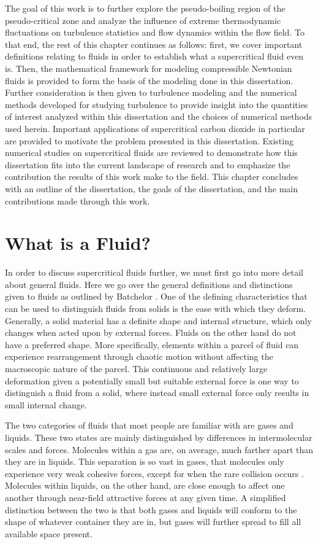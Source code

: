 The goal of this work is to further explore the pseudo-boiling region of the pseudo-critical zone and analyze the influence of extreme thermodynamic fluctuations on turbulence statistics and flow dynamics within the flow field. To that end, the rest of this chapter continues as follows: first, we cover important definitions relating to fluids in order to establish what a supercritical fluid even is. Then, the mathematical framework for modeling compressible Newtonian fluids is provided to form the basis of the modeling done in this dissertation. Further consideration is then given to turbulence modeling and the numerical methods developed for studying turbulence to provide insight into the quantities of interest analyzed within this dissertation and the choices of numerical methods used herein. Important applications of supercritical carbon dioxide in particular are provided to motivate the problem presented in this dissertation. Existing numerical studies on supercritical fluids are reviewed to demonstrate how this dissertation fits into the current landscape of research and to emphasize the contribution the results of this work make to the field. This chapter concludes with an outline of the dissertation, the goals of the dissertation, and the main contributions made through this work. 

\section{What is a Fluid?} 

In order to discuss supercritical fluids further, we must first go into more detail about general fluids. Here we go over the general definitions and distinctions given to fluids as outlined by Batchelor \cite{batchelor_2000}. One of the defining characteristics that can be used to distinguish fluids from solids is the ease with which they deform. Generally, a solid material has a definite shape and internal structure, which only changes when acted upon by external forces. Fluids on the other hand do not have a preferred shape. More specifically, elements within a parcel of fluid can experience rearrangement through chaotic motion without affecting the macroscopic nature of the parcel. This continuous and relatively large deformation given a potentially small but suitable external force is one way to distinguish a fluid from a solid, where instead small external force only results in small internal change. 

The two categories of fluids that most people are familiar with are gases and liquids. These two states are mainly distinguished by differences in intermolecular scales and forces. Molecules within a gas are, on average, much farther apart than they are in liquids. This separation is so vast in gases, that molecules only experience very weak cohesive forces, except for when the rare collision occurs \cite{batchelor_2000}. Molecules within liquids, on the other hand, are close enough to affect one another through near-field attractive forces at any given time. A simplified distinction between the two is that both gases and liquids will conform to the shape of whatever container they are in, but gases will further spread to fill all available space present. 

